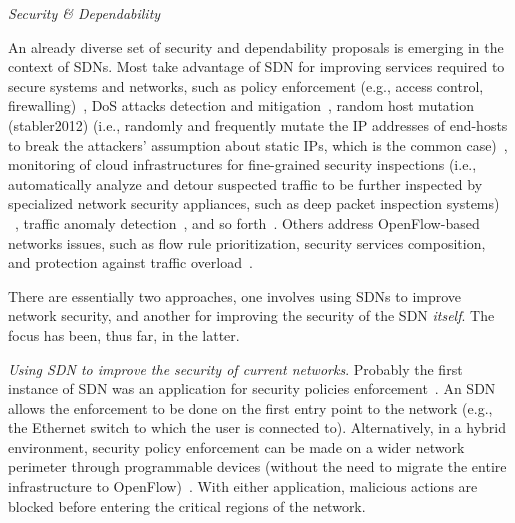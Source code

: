 \vspace{2mm}
\noindent \textit{Security \& Dependability}

An already diverse set of security and dependability proposals is emerging in the context of SDNs.
Most take advantage 
of SDN for improving services required to secure systems and networks, such as policy enforcement (e.g., access 
control, firewalling)~\cite{casado2006,wang2012-1,yao2011,stabler2012}, DoS attacks detection and mitigation~\cite{braga2010-1}, random host mutation (stabler2012) (i.e., randomly and frequently mutate the IP addresses of end-hosts to break the attackers' assumption about static IPs, which is the common case)~\cite{jafarian2012}, monitoring of cloud infrastructures for fine-grained security inspections (i.e., automatically analyze and detour suspected traffic to be  further inspected by specialized network security appliances, such as deep packet inspection systems) ~\cite{shin2012}, traffic anomaly detection~\cite{mehdi2011,braga2010-1}, and so forth~\cite{casado2006,wang2012-1,braga2010-1,jafarian2012,shin2012,stabler2012,yao2011,mehdi2011}.
Others address OpenFlow-based networks issues, such as flow rule prioritization, security 
services composition, and protection against traffic overload~\cite{porras2012,shin2013-1,shin2013-3,wang2013}.

There are essentially two approaches, one involves using SDNs to improve network security, and another for improving the 
security of the SDN \emph{itself}. 
The focus has been, thus far, in the latter.

%

\noindent \textit{Using SDN to improve the security of current networks}.
Probably the first instance of SDN was an application for security policies enforcement~\cite{casado2006}. 
An SDN allows the enforcement to be done on the first entry point to the network (e.g., the Ethernet switch to which the user is connected to). 
Alternatively, in a hybrid environment, security policy enforcement can be made on a wider network perimeter through programmable devices (without the need to migrate the entire infrastructure to OpenFlow)~\cite{wang2012-1}.
With either application, malicious actions are blocked before entering the critical regions of the network.

